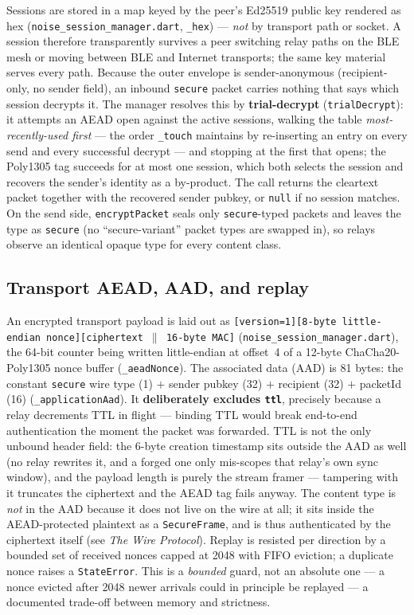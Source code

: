 \documentclass[11pt]{report}
\newcommand{\code}[1]{\texttt{\small #1}}
\begin{document}
Sessions are stored in a map keyed by the peer's Ed25519 public key rendered as hex (\code{noise\_session\_manager.dart}, \code{\_hex}) --- \emph{not} by transport path or socket. A session therefore transparently survives a peer switching relay paths on the BLE mesh or moving between BLE and Internet transports; the same key material serves every path. Because the outer envelope is sender-anonymous (recipient-only, no sender field), an inbound \code{secure} packet carries nothing that says which session decrypts it. The manager resolves this by \textbf{trial-decrypt} (\code{trialDecrypt}): it attempts an AEAD open against the active sessions, walking the table \emph{most-recently-used first} --- the order \code{\_touch} maintains by re-inserting an entry on every send and every successful decrypt --- and stopping at the first that opens; the Poly1305 tag succeeds for at most one session, which both selects the session and recovers the sender's identity as a by-product. The call returns the cleartext packet together with the recovered sender pubkey, or \code{null} if no session matches. On the send side, \code{encryptPacket} seals only \code{secure}-typed packets and leaves the type as \code{secure} (no ``secure-variant'' packet types are swapped in), so relays observe an identical opaque type for every content class.

\subsection*{Transport AEAD, AAD, and replay}

An encrypted transport payload is laid out as \code{[version=1][8-byte little-endian nonce][ciphertext $\|$ 16-byte MAC]} (\code{noise\_session\_manager.dart}), the 64-bit counter being written little-endian at offset~4 of a 12-byte ChaCha20-Poly1305 nonce buffer (\code{\_aeadNonce}). The associated data (AAD) is 81 bytes: the constant \code{secure} wire type (1) $+$ sender pubkey (32) $+$ recipient (32) $+$ packetId (16) (\code{\_applicationAad}). It \textbf{deliberately excludes \code{ttl}}, precisely because a relay decrements TTL in flight --- binding TTL would break end-to-end authentication the moment the packet was forwarded. TTL is not the only unbound header field: the 6-byte creation timestamp sits outside the AAD as well (no relay rewrites it, and a forged one only mis-scopes that relay's own sync window), and the payload length is purely the stream framer --- tampering with it truncates the ciphertext and the AEAD tag fails anyway. The content type is \emph{not} in the AAD because it does not live on the wire at all; it sits inside the AEAD-protected plaintext as a \code{SecureFrame}, and is thus authenticated by the ciphertext itself (see \emph{The Wire Protocol}). Replay is resisted per direction by a bounded set of received nonces capped at 2048 with FIFO eviction; a duplicate nonce raises a \code{StateError}. This is a \emph{bounded} guard, not an absolute one --- a nonce evicted after 2048 newer arrivals could in principle be replayed --- a documented trade-off between memory and strictness.
\end{document}
